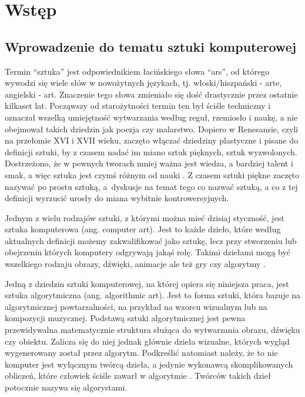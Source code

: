 \chapter{Wstęp} \label{intro}
    \section{Wprowadzenie do tematu sztuki komputerowej} \label{intro-intro}
    Termin ``sztuka'' jest odpowiednikiem łacińskiego słowa ``ars'', od którego wywodzi się wiele słów w nowożytnych językach, tj. włoski/hiszpański - arte, angielski - art. Znaczenie tego słowa zmieniało się dość drastycznie przez ostatnie kilkaset lat. Począwszy od starożytności termin ten był ściśle techniczny i oznaczał wszelką umiejętność wytwarzania według reguł, rzemiosło i naukę, a nie obejmował takich dziedzin jak poezja czy malarstwo.
    Dopiero w Renesansie, czyli na przełomie XVI i XVII wieku, zaczęto włączać dziedziny plastyczne i pisane do definicji sztuki, by z czasem nadać im miano sztuk pięknych, sztuk wyzwolonych. Dostrzeżono, że w pewnych tworach mniej ważna jest wiedza, a bardziej talent i smak, a więc sztuka jest czymś różnym od nauki \cite{sztuka}. Z czasem sztuki piękne zaczęto nazywać po prostu sztuką, a~dyskusje na temat tego co nazwać sztuką, a co z tej definicji wyrzucić urosły do miana wybitnie kontrowersyjnych. 
    
    Jednym z wielu rodzajów sztuki, z którymi można mieć dzisiaj styczność, jest sztuka komputerowa (ang. computer art). Jest to każde dzieło, które według aktualnych definicji możemy zakwalifikować jako sztukę, lecz przy stworzeniu lub obejrzeniu których komputery odgrywają jakąś rolę. Takimi dziełami mogą być wszelkiego rodzaju obrazy, dźwięki, animacje ale też gry czy algorytmy \cite{computer-art}.
    
    Jedną z dziedzin sztuki komputerowej, na której opiera się niniejsza praca, jest sztuka algorytmiczna (ang. algorithmic art). Jest to forma sztuki, która bazuje na algorytmicznej powtarzalności, na przykład na wzorcu wizualnym lub na kompozycji muzycznej. Podstawą sztuki algorytmicznej jest pewna przewidywalna matematycznie struktura służąca do wytwarzania obrazu, dźwięku czy obiektu. Zalicza się do niej jednak głównie dzieła wizualne, których wygląd wygenerowany został przez algorytm. Podkreślić natomiast należy, że to nie komputer jest wyłącznym twórcą dzieła, a jedynie wykonawcą skomplikowanych obliczeń, które człowiek ściśle zawarł w algorytmie \cite{selected-works}. Twórców takich dzieł potocznie nazywa się algorystami.
    
